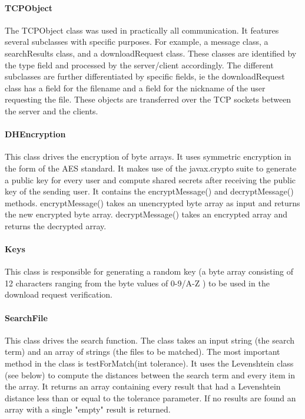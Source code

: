 \documentclass[12pt, a4paper]{article}
\begin{document}
\paragraph{TCPObject}\label{sec:TCPObject}
The TCPObject class was used in practically all communication. It features several subclasses with specific purposes. For example, a message class, a searchResults class, and a downloadRequest class. These classes are identified by the type field and processed by the server/client accordingly. The different subclasses are further differentiated by specific fields, ie the downloadRequest class has a field for the filename and a field for the nickname of the user requesting the file. These objects are transferred over the TCP sockets between the server and the clients.

\paragraph{DHEncryption}
This class drives the encryption of byte arrays. It uses symmetric encryption in the form of the AES standard. It makes use of the javax.crypto suite to generate a public key for every user and compute shared secrets after receiving the public key of the sending user. It contains the encryptMessage() and decryptMessage() methods. encryptMessage() takes an unencrypted byte array as input and returns the new encrypted byte array. decryptMessage() takes an encrypted array and returns the decrypted array.

\paragraph{Keys}
This class is responsible for generating a random key (a byte array consisting of 12 characters ranging from the byte values of 0-9/A-Z ) to be used in the download request verification.

\paragraph{SearchFile}
This class drives the search function. The class takes an input string (the search term) and an array of strings (the files to be matched). The most important method in the class is testForMatch(int tolerance). It uses the Levenshtein class (see below) to compute the distances between the search term and every item in the array. It returns an array containing every result that had a Levenshtein distance less than or equal to the tolerance parameter. If no results are found an array with a single "empty" result is returned.
\end{document}
